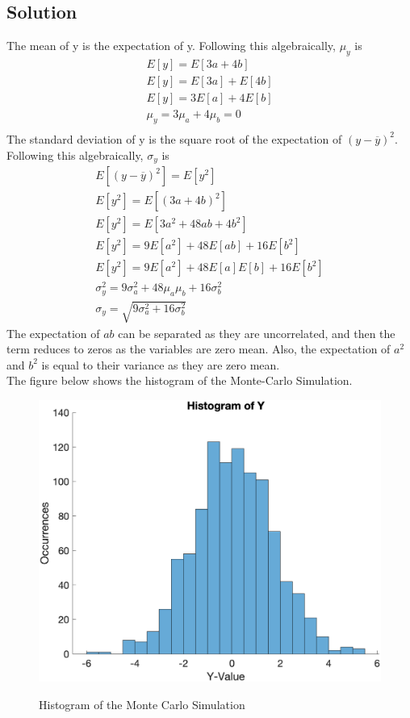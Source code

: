 \documentclass{article}
\begin{document}
\subsection*{Solution}
The mean of y is the expectation of y.  Following this algebraically, $\mu_y$ is
\begin{gather*}
    E \left[y\right] = E \left[3a+4b\right]\\
    E \left[y\right] = E \left[3a\right] + E \left[4b\right]\\
    E \left[y\right] = 3E \left[a\right] + 4 E \left[b\right]\\
    \mu_y = 3\mu_a + 4\mu_b = 0 \\
\end{gather*}
The standard deviation of y is the square root of the expectation of $(y - \overline{y})^2$.  Following this algebraically, $\sigma_y$ is
\begin{gather*}
    E \left[(y - \overline{y})^2\right] = E \left[y^2\right]\\
    E \left[y^2\right] = E \left[(3a + 4b)^2\right]\\
    E \left[y^2\right] = E \left[3a^2 + 48ab + 4b^2\right]\\
    E \left[y^2\right] = 9E \left[a^2\right] + 48E\left[ab\right] + 16E\left[b^2\right]\\
    E \left[y^2\right] = 9E \left[a^2\right] + 48E\left[a\right]E\left[b\right] + 16E\left[b^2\right]\\
    \sigma_y^2 = 9\sigma_a^2 + 48\mu_a\mu_b + 16\sigma_b^2\\
    \sigma_y = \sqrt{9\sigma_a^2 + 16\sigma_b^2}
\end{gather*}
The expectation of $ab$ can be separated as they are uncorrelated, and then the term reduces to zeros as the variables are zero mean.  Also, the expectation of $a^2$ and $b^2$ is equal to their variance as they are zero mean.\\
The figure below shows the histogram of the Monte-Carlo Simulation.
\begin{figure}[H]
    \centering
    \includegraphics[width=0.75\linewidth]{../figures/p1_histogram.png}\label{fig:p1_hist}
    \caption{Histogram of the Monte Carlo Simulation}
\end{figure}
\end{document}
